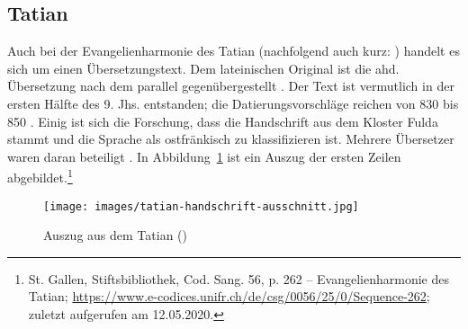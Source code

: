 \subsection{Tatian}\label{sec:tatian}

Auch bei der Evangelienharmonie des Tatian (nachfolgend auch kurz: ) handelt es sich um einen Übersetzungstext. Dem lateinischen Original ist die ahd. Übersetzung nach dem  \parencite[43]{Fleischer2011} parallel gegenübergestellt \parencite[vgl. hierzu auch][128]{Masser1997}. Der Text ist vermutlich in der ersten Hälfte des 9. Jhs. entstanden; die Datierungsvorschläge reichen von 830 \parencite[LXX]{Sievers1961} bis 850 \parencite[127]{Sonderegger2003}. Einig ist sich die Forschung, dass die Handschrift aus dem Kloster Fulda stammt und die Sprache als ostfränkisch zu klassifizieren ist. Mehrere Übersetzer waren daran beteiligt \parencite[s.][31]{Masser1994}. In Abbildung~\ref{abb:tatian-hand} ist ein Auszug der ersten Zeilen abgebildet.\footnote{St. Gallen, Stiftsbibliothek, Cod. Sang. 56, p. 262 –
Evangelienharmonie des Tatian; \url{https://www.e-codices.unifr.ch/de/csg/0056/25/0/Sequence-262}; zuletzt aufgerufen am 12.05.2020.}

\begin{figure}[h]
\begin{center}
  \texttt{[image: images/tatian-handschrift-ausschnitt.jpg]}
\caption {Auszug aus dem Tatian ()}
\label{abb:tatian-hand}
\end{center}
\end{figure} 




